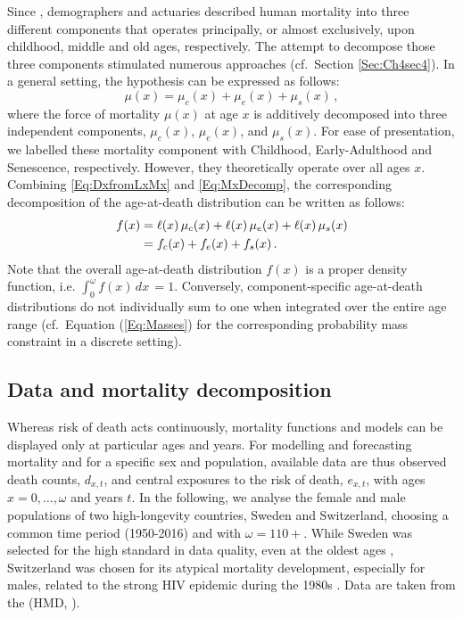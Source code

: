 \documentclass[Thesis]{subfiles}
\begin{document}
Since \cite{thiele1871mathematical}, demographers and actuaries described human mortality into three different components that operates principally, or almost exclusively, upon childhood, middle and old ages, respectively. The attempt to decompose those three components stimulated numerous approaches (cf.~Section \ref{Sec:Ch4sec4}). In a general setting, the hypothesis can be expressed as follows:
%
\begin{equation}\label{Eq:MxDecomp}
\mu(x)=\mu_{c}(x)+\mu_{e}(x)+\mu_{s}(x)  \, ,
\end{equation}
%
where the force of mortality $\mu(x)$ at age $x$ is additively decomposed into three independent components, $\mu_{c}(x)$, $\mu_{e}(x)$, and $\mu_s(x)$. For ease of presentation, we labelled these mortality component with Childhood, Early-Adulthood and Senescence, respectively. However, they theoretically operate over all ages $x$. Combining \eqref{Eq:DxfromLxMx} and \eqref{Eq:MxDecomp}, the corresponding decomposition of the age-at-death distribution can be written as follows: 
%
\begin{align}\label{Eq:FxDecom}
f(x) & = \ell(x)\,\mu_{c}(x) + \ell(x)\,\mu_{e}(x) + \ell(x)\,\mu_{s}(x) \notag \\
& = f_{c}(x)+f_{e}(x)+f_{s}(x) \, . 
\end{align}
%
Note that the overall age-at-death distribution $f(x)$ is a proper density function, i.e. $\int_{0}^{\omega} f(x)\,dx\, = 1$. Conversely, component-specific age-at-death distributions do not individually sum to one when integrated over the entire age range (cf.~Equation (\ref{Eq:Masses}) for the corresponding probability mass constraint in a discrete setting).

\subsection{Data and mortality decomposition}\label{Subsec:Ch4subsec2.2}
Whereas risk of death acts continuously, mortality functions and models can be displayed only at particular ages and years. For modelling and forecasting mortality and for a specific sex and population, available data are thus observed death counts, $d_{x,t}$, and central exposures to the risk of death, $e_{x,t}$, with ages $x=0,\dots,\omega$ and years $t$. In the following, we analyse the female and male populations of two high-longevity countries, Sweden and Switzerland, choosing a common time period (1950-2016) and with $\omega=110+$. While Sweden was selected for the high standard in data quality, even at the oldest ages \citep{vaupel1994longer,wilmoth1996extreme}, Switzerland was chosen for its atypical mortality development, especially for males, related to the strong HIV epidemic during the 1980s \citep{csete2012switzerland}. Data are taken from the \citeauthor{HMD} (HMD, \citeyear{HMD}). 
\end{document}
